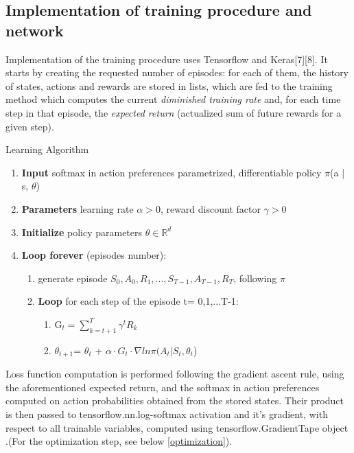 \documentclass{article}
\begin{document}
\subsection{Implementation of training procedure and network}
\label{training}
Implementation of the training procedure uses Tensorflow and Keras[7][8]. It starts by creating the requested number of episodes: for each of them, the history of states, actions and rewards are stored in lists, which are fed to the training method which computes the current \emph{diminished training rate} and, for each time step in that episode, the \emph{expected return} (actualized sum of future rewards for a given step).
\begin{algorithm}[H]
  \caption{Learning Algorithm}\label{alg:learning}
\end{algorithm}
\begin{enumerate}
    \item \textbf{Input} softmax in action preferences parametrized, differentiable policy $\pi$(a | s, $\theta$)
    \item \textbf{Parameters} learning rate $\alpha >0$, reward discount factor $\gamma >0$
    \item \textbf{Initialize} policy parameters $\theta \in \mathbb{R}^{d}$ 
    \item \textbf{Loop forever} (episodes number):
    \begin{enumerate}
        \item generate episode $S_0,A_0,R_1,...,S_{T-1},A_{T-1},R_T$, following $\pi$
        \item \textbf{Loop} for each step of the episode t= 0,1,...T-1:
        \begin{enumerate}
            \item G$_t = \sum_{k=t+1}^{T} \gamma^{t} R_k$
            \item $\theta_{t+1}$= $\theta_t$ + $\alpha\cdot G_t\cdot\nabla ln\pi(A_t | S_t,\theta_t$)
        \end{enumerate}
    \end{enumerate}
\end{enumerate}
Loss function computation is performed following the gradient ascent rule, using the aforementioned expected return, and the softmax in action preferences computed on action probabilities obtained from the stored states. Their product is then passed to tensorflow.nn.log-softmax activation and it's gradient, with respect to all trainable variables, computed using tensorflow.GradientTape object .(For the optimization step, see below \ref{optimization}).
\end{document}
